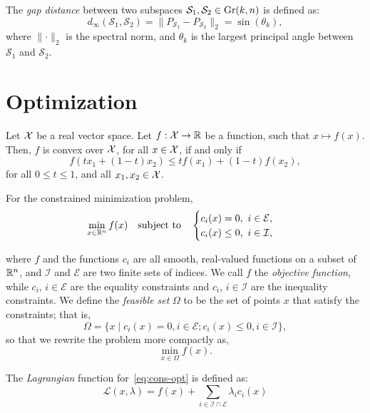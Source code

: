 \begin{definition}
    The \textit{gap distance} between two subspaces $\mathcal{S}_1, \mathcal{S}_2 \in \text{Gr}(k,n)$ is defined as:
    \[
        d_{\infty}(\mathcal{S}_1, \mathcal{S}_2) = \lVert P_{\mathcal{S}_1} - P_{\mathcal{S}_2} \rVert_{2} = \sin(\theta_k),
    \]
    where $\lVert \cdot \rVert_{2}$ is the spectral norm, and $\theta_k$ is the largest principal angle between $\mathcal{S}_1$ and $\mathcal{S}_2$.
    
\end{definition}

\newpage
\section{Optimization}

\begin{definition}[Convexity]\label{def:conv}
    Let $\mathcal{X}$ be a real vector space. Let $f: \mathcal{X} \to \mathbb{R}$ be a function, such that $x \mapsto f(x)$. Then, $f$ is convex over $\mathcal{X}$, for all $x \in \mathcal{X}$, if and only if
    \[
        f(t x_1 + (1-t)x_2) \leq t f(x_1) + (1-t)f(x_2), 
    \]
    for all $0\leq t \leq 1$, and all $x_1, x_2 \in \mathcal{X}$.
\end{definition}
\begin{definition}
    For the constrained minimization problem,
    \begin{equation}\label{eq:cons-opt}
        \min_{x \in \mathbb{R}^n} f(x) \quad \textrm{subject to} \quad \begin{cases}
            c_i(x) = 0, \ i \in \mathcal{E}, \\
            c_i(x) \leq 0, \ i \in \mathcal{I},
        \end{cases}
    \end{equation}
\end{definition}
where $f$ and the functions $c_i$ are all smooth, real-valued functions on a subset of $\mathbb{R}^n$, and $\mathcal{I}$ and $\mathcal{E}$ are two finite sets of indices. We call $f$ the \textit{objective function}, while $c_i$, $i \in \mathcal{E}$ are the equality constraints and $c_i$, $i \in \mathcal{I}$ are the inequality constraints. We define the \textit{feasible set} $\Omega$ to be the set of points $x$ that satisfy the constraints; that is,
\[
    \Omega = \{x \mid c_i(x) = 0, i \in \mathcal{E}; c_i(x) \leq 0, i \in \mathcal{I} \},
\]
so that we rewrite the problem more compactly as,
\[
    \min_{x \in \Omega} f(x).
\]
\begin{definition}
    The \textit{Lagrangian} function for~\eqref{eq:cons-opt} is defined as:
    \[
        \mathcal{L}(x, \lambda) = f(x) + \sum_{i \in \mathcal{I} \cap \mathcal{E}} \lambda_i c_i(x) 
    \]
\end{definition}
